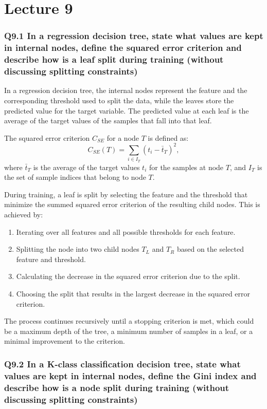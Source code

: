 \documentclass[11pt]{article}
\begin{document}
\part{Lecture 9}

\section{Q9.1 In a regression decision tree, state what values are kept in internal nodes, define the squared error criterion and describe how is a leaf split during training (without discussing splitting constraints)}

In a regression decision tree, the internal nodes represent the feature and the corresponding threshold used to split the data, while the leaves store the predicted value for the target variable. The predicted value at each leaf is the average of the target values of the samples that fall into that leaf.

The squared error criterion \( C_{SE} \) for a node \( T \) is defined as:
\[
C_{SE}(T) = \sum_{i \in I_T} (t_i - \bar{t}_T)^2,
\]
where \( \bar{t}_T \) is the average of the target values \( t_i \) for the samples at node \( T \), and \( I_T \) is the set of sample indices that belong to node \( T \).

During training, a leaf is split by selecting the feature and the threshold that minimize the summed squared error criterion of the resulting child nodes. This is achieved by:
\begin{enumerate}
    \item Iterating over all features and all possible thresholds for each feature.
    \item Splitting the node into two child nodes \( T_L \) and \( T_R \) based on the selected feature and threshold.
    \item Calculating the decrease in the squared error criterion due to the split.
    \item Choosing the split that results in the largest decrease in the squared error criterion.
\end{enumerate}
The process continues recursively until a stopping criterion is met, which could be a maximum depth of the tree, a minimum number of samples in a leaf, or a minimal improvement to the criterion.

\section{Q9.2 In a K-class classification decision tree, state what values are kept in internal nodes, define the Gini index and describe how is a node split during training (without discussing splitting constraints)}
\end{document}
